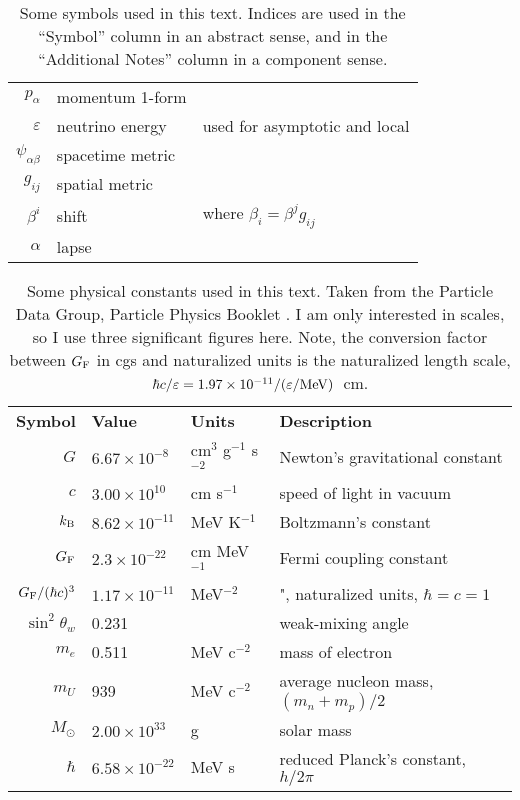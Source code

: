 \begin{table}
\begin{tabular}{rll}
    $p_\alpha$            & momentum 1-form           & \\
    $\varepsilon$         & neutrino energy           & used for asymptotic and local \\
    $\psi_{\alpha\beta}$  & spacetime metric          & \\
    $g_{ij}$              & spatial metric            & \\
    $\beta^i$             & shift                     & where $\beta_i = \beta^j g_{ij}$ \\
    $\alpha$              & lapse                     & \\
  \end{tabular}
  \caption[Symbols used in the text]{
    Some symbols used in this text.
    Indices are used in the ``Symbol'' column in an abstract sense, and in the
    ``Additional Notes'' column in a component sense.
  }
  \label{tab:conventions}
\end{table}

\begin{table}
  \centering
  \begin{tabular}{rlll}
    \textbf{Symbol} & \textbf{Value}       & \textbf{Units}           & \textbf{Description} \\
    $G$             & $6.67\times10^{-8}$  & cm$^3$ g$^{-1}$ s$^{-2}$ & Newton's gravitational constant \\
    $c$             & $3.00\times10^{10}$  & cm s$^{-1}$              & speed of light in vacuum \\
    $k_{\rm B}$     & $8.62\times10^{-11}$ & MeV K$^{-1}$             & Boltzmann's constant \\
    $G_{\rm F}$     & $2.3\times10^{-22}$  & cm MeV$^{-1}$            & Fermi coupling constant \\
    $G_{\rm F}/(\hbar c)^3$ & $1.17\times10^{-11}$ & MeV$^{-2}$       & ", naturalized units, $\hbar=c=1$ \\
    $\sin^2\theta_w$& 0.231                &                          & weak-mixing angle \\
    $m_e$           & 0.511                & MeV c$^{-2}$             & mass of electron \\
    $m_U$           & 939                  & MeV c$^{-2}$             & average nucleon mass, $(m_n+m_p)/2$ \\
    $M_\odot$       & $2.00\times10^{33}$  & g                        & solar mass \\
    $\hbar$         & $6.58\times10^{-22}$ & MeV s                    & reduced Planck's constant, $h/2\pi$ \\
  \end{tabular}
  \caption[Physical constants used in the text]{
    Some physical constants used in this text. Taken from the Particle Data
    Group, Particle Physics Booklet \citep{oliv2014-pdg}.
    I am only interested in scales, so I use three significant figures here.
    Note, the conversion factor between $G_{\rm F}$ in cgs and
    naturalized units is the naturalized length scale,
    $\hbar c/\varepsilon=1.97\times10^{-11}/(\varepsilon/{\rm MeV})$~cm.
  }
  \label{tab:constants}
\end{table}
